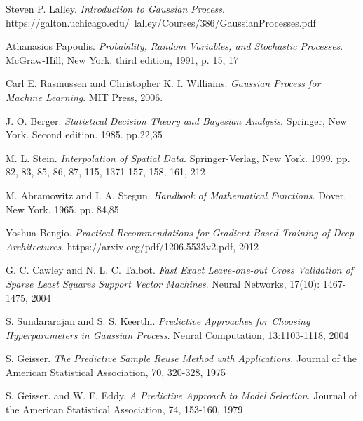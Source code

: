 \documentclass[11pt,a4paper]{article}
\theoremstyle{definition}
\numberwithin{equation}{section}
\begin{document}
%
%
%
%
%
\newpage
\begin{thebibliography}{10}

Steven P. Lalley.
\textit{Introduction to Gaussian Process}. 
https://galton.uchicago.edu/~lalley/Courses/386/GaussianProcesses.pdf

Athanasios Papoulis.
\textit{Probability, Random Variables, and Stochastic Processes}. 
McGraw-Hill, New York, third edition, 1991, p. 15, 17

Carl E. Rasmussen and Christopher K. I. Williams.
\textit{Gaussian Process for Machine Learning}. 
MIT Press, 2006.

J. O. Berger.
\textit{Statistical Decision Theory and Bayesian Analysis}. 
Springer, New York. Second edition. 1985. pp.22,35

M. L. Stein.
\textit{Interpolation of Spatial Data}. 
Springer-Verlag, New York. 1999. pp. 82, 83, 85, 86, 87, 115, 1371 157, 158, 161, 212

M. Abramowitz and I. A. Stegun.
\textit{Handbook of Mathematical Functions}. 
Dover, New York. 1965. pp. 84,85

Yoshua Bengio.
\textit{Practical Recommendations for Gradient-Based Training of Deep Architectures}. 
https://arxiv.org/pdf/1206.5533v2.pdf, 2012

G. C. Cawley and N. L. C. Talbot.
\textit{Fast Exact Leave-one-out Cross Validation of Sparse Least Squares Support Vector Machines}. 
Neural Networks, 17(10): 1467-1475, 2004

S. Sundararajan and S. S. Keerthi.
\textit{Predictive Approaches for Choosing Hyperparameters in Gaussian Process}. 
Neural Computation, 13:1103-1118, 2004

S. Geisser.
\textit{The Predictive Sample Reuse Method with Applications}. 
Journal of the American Statistical Association, 70, 320-328, 1975

S. Geisser. and W. F. Eddy.
\textit{A Predictive Approach to Model Selection}. 
Journal of the American Statistical Association, 74, 153-160, 1979


\end{thebibliography}
\end{document}
